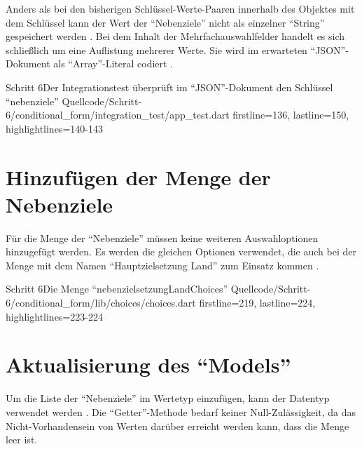 Anders als bei den bisherigen Schlüssel-Werte-Paaren innerhalb des Objektes mit dem Schlüssel  kann der Wert der \enquote{Nebenziele} nicht als einzelner \enquote{String} gespeichert werden \Lst{\ref{lst:Schritt6expectedJson}}.
Bei dem Inhalt der Mehrfachauswahlfelder handelt es sich schließlich um eine Auflistung mehrerer Werte.
Sie wird im erwarteten \enquote{JSON}-Dokument als \enquote{Array}-Literal codiert .



\begin{alexlisting}{Schritt 6}{Der Integrationstest überprüft im \enquote{JSON}-Dokument den Schlüssel \enquote{nebenziele}}
  {Quellcode/Schritt-6/conditional_form/integration_test/app_test.dart}
  {firstline=136, lastline=150, highlightlines={140-143}}
  \label{lst:Schritt6expectedJson}
\end{alexlisting}



\section{Hinzufügen der Menge der Nebenziele}

Für die Menge der \enquote{Nebenziele} müssen keine weiteren Auswahloptionen hinzugefügt werden.
Es werden die gleichen Optionen verwendet,
die auch bei der Menge  mit dem Namen \enquote{Hauptzielsetzung Land} zum Einsatz kommen .

\begin{alexlisting}{Schritt 6}{Die Menge \enquote{nebenzielsetzungLandChoices}}
  {Quellcode/Schritt-6/conditional_form/lib/choices/choices.dart}
  {firstline=219, lastline=224, highlightlines={223-224}}
  \label{lst:Schritt6nebenzielsetzungLandChoices}
\end{alexlisting}

\section{Aktualisierung des \enquote{Models}}

Um die Liste der \enquote{Nebenziele} im Wertetyp  einzufügen,
kann der Datentyp  verwendet werden .
Die \enquote{Getter}-Methode  bedarf keiner Null-Zulässigkeit,
da das Nicht-Vorhandensein von Werten darüber erreicht werden kann,
dass die Menge leer ist.

